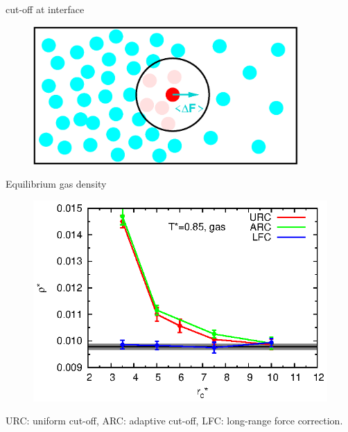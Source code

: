 \documentclass{beamer}
\begin{document}
\begin{frame}{cut-off at interface}
  \begin{figure}
    \centering
    \includegraphics[width=0.9\textwidth]{figs/t0.85-n16000-rc07.5uni/cut-interface-step05.eps}
  \end{figure}  
\end{frame}

\begin{frame}{Equilibrium gas density}
  \begin{figure}
    \centering
    \includegraphics[]{figs/converge.new/t0p85-gas.eps} 
  \end{figure}
  URC: uniform cut-off, ARC: adaptive cut-off, LFC: long-range force correction.
\end{frame}
\end{document}

